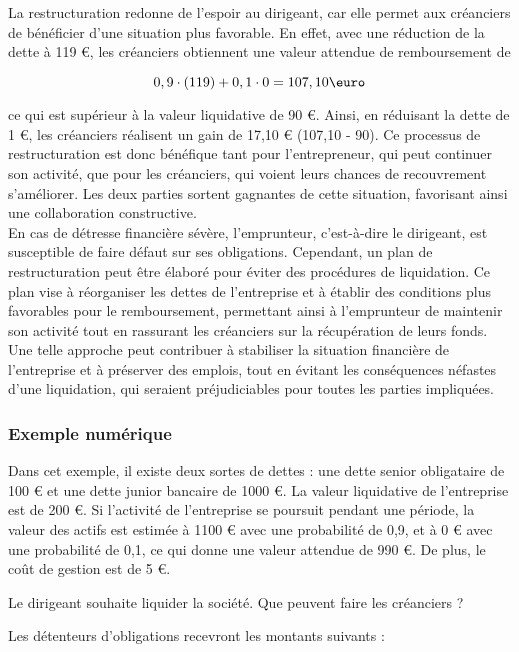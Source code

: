 \documentclass[a4paper, 12pt]{report}
\begin{document}
La restructuration redonne de l'espoir au dirigeant, car elle permet aux créanciers de bénéficier d'une situation plus favorable. En effet, avec une réduction de la dette à 119 €, les créanciers obtiennent une valeur attendue de remboursement de

$$ 0,9  \cdot (119) + 0,1 \cdot 0 = 107,10\text{\euro} $$ 
 
ce qui est supérieur à la valeur liquidative de 90 €. Ainsi, en réduisant la dette de 1 €, les créanciers réalisent un gain de 17,10 € (107,10 - 90). Ce processus de restructuration est donc bénéfique tant pour l'entrepreneur, qui peut continuer son activité, que pour les créanciers, qui voient leurs chances de recouvrement s'améliorer. Les deux parties sortent gagnantes de cette situation, favorisant ainsi une collaboration constructive.\\


En cas de détresse financière sévère, l'emprunteur, c'est-à-dire le dirigeant, est susceptible de faire défaut sur ses obligations. Cependant, un plan de restructuration peut être élaboré pour éviter des procédures de liquidation. Ce plan vise à réorganiser les dettes de l'entreprise et à établir des conditions plus favorables pour le remboursement, permettant ainsi à l'emprunteur de maintenir son activité tout en rassurant les créanciers sur la récupération de leurs fonds. Une telle approche peut contribuer à stabiliser la situation financière de l'entreprise et à préserver des emplois, tout en évitant les conséquences néfastes d'une liquidation, qui seraient préjudiciables pour toutes les parties impliquées.

\subsubsection{Exemple numérique}

Dans cet exemple, il existe deux sortes de dettes : une dette senior obligataire de 100 € et une dette junior bancaire de 1000 €. La valeur liquidative de l'entreprise est de 200 €. Si l'activité de l'entreprise se poursuit pendant une période, la valeur des actifs est estimée à 1100 € avec une probabilité de 0,9, et à 0 € avec une probabilité de 0,1, ce qui donne une valeur attendue de 990 €. De plus, le coût de gestion est de 5 €.

Le dirigeant souhaite liquider la société. Que peuvent faire les créanciers ?

Les détenteurs d'obligations recevront les montants suivants :
\end{document}
